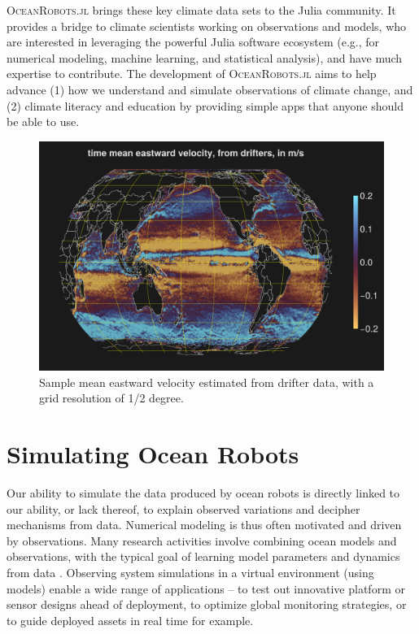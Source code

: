\documentclass{juliacon}[12pt]
\newcommand{\pkg}[1]{{\small \textsc{#1}}}
\begin{document}
\pkg{OceanRobots.jl} brings these key climate data sets to the Julia community. It provides a bridge to climate scientists working on observations and models, who are interested in leveraging the powerful Julia software ecosystem (e.g., for numerical modeling, machine learning, and statistical analysis), and have much expertise to contribute. The development of \pkg{OceanRobots.jl} aims to help advance (1) how we understand and simulate observations of climate change, and (2) climate literacy and education by providing simple apps that anyone should be able to use.

\begin{figure}[t]
\centerline{\includegraphics[width=\columnwidth]{figs/20240528_ve_mean.png}}
\caption{Sample mean eastward velocity estimated from drifter data, with a grid resolution of 1/2 degree.}
\label{fig:drifters_ve}
\end{figure}

\section{Simulating Ocean Robots}

Our ability to simulate the data produced by ocean robots is directly linked to our ability, or lack thereof, to explain observed variations and decipher mechanisms from data. Numerical modeling is thus often motivated and driven by observations. Many research activities involve combining ocean models and observations, with the typical goal of learning model parameters and dynamics from data \cite{Forget2010,Forget2015a,FFL15,FP15,Forget2024a}. Observing system simulations in a virtual environment (using models) enable a wide range of applications -- to test out innovative platform or sensor designs ahead of deployment, to optimize global monitoring strategies, or to guide deployed assets in real time for example.
\end{document}
